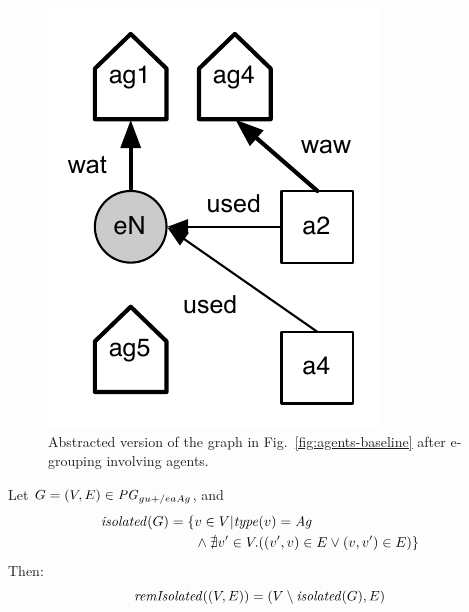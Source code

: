 \begin{figure}
\centering
\includegraphics[scale=.5]{figures/agents-baseline-abstracted}
\caption{Abstracted version of the graph in Fig.~\ref{fig:agents-baseline} after e-grouping involving agents.}
\label{agents-baseline-abstracted}
\end{figure}


\begin{definition}
\label{def:orphanremove}
Let $G = (V,E) \in \mathit{PG}_{gu+/eaAg}$, and 
\begin{align*}
 \mathit{isolated}(G) = \{  & v \in V | \mathit{type}(v) = \mathit{Ag} \\
   & \wedge \nexists v' \in V . ((v',v) \in E \vee (v,v') \in E) \}
\end{align*}
Then:
\[ \mathit{remIsolated}((V,E)) = (V \setminus \mathit{isolated}(G), E) \] 
\end{definition}


